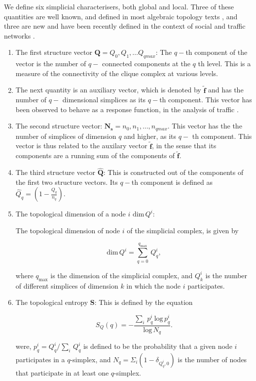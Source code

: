 \documentclass[aps,pre,superscriptaddress,groupedaddress,preprint]{revtex4}  %
\begin{document}
We define six simplicial characterisers, both global and local. Three of these quantities are well known, and defined in most algebraic topology texts \cite{jonsson}, and three  are new and have been recently defined in the context of social and traffic networks \cite{Maletic, Andjelkovich}. 

\begin{enumerate}

\item The first structure vector $\mathbf{Q} = Q_{0},Q_{1}, \ldots Q_{qmax}$: 
The $q-$th component of the vector is the number of $q-$ connected components at the $q$ th level.
This is a measure of the connectivity of the clique complex at various levels.   
\item The next quantity is an auxiliary vector, which is denoted by $\mathbf{\tilde{f}}$ and has the number of $q-$ dimensional simplices as its $q-$th component. This vector has been observed to behave as a response function, in the analysis of traffic \cite{Andjelkovich}.

\item The second structure vector: $\mathbf{N_s}=n_0, n_1, \ldots, n_{qmax}$. This vector has the the number of simplices of dimension $q$ and higher, as its $q-$ th component. This vector is thus related to the auxilary vector $\mathbf{\tilde{f}}$, in the sense that its components are a running sum of the components of $\mathbf{\tilde{f}}$.

\item The third structure vector $\mathbf{\widehat{Q}}$: This is constructed out of the components of the first two structure vectors. Its $q-$th component is defined as 
$\widehat{Q}_q= \left(1-\frac{Q_q}{n_q}\right)$.

\item   

The topological dimension of a node $i$  $\mathrm{dim}\, Q^{i}$: 

The topological dimension of node $i$ of the simplicial complex, is given by

\begin{equation}
\mathrm{dim}\,Q^i = \sum_{q=0}^{q_{\mathrm{max}}}\,Q_q^i,
\end{equation}

where $q_{\mathrm{max}}$ is the dimension of the simplicial complex, and $Q_{k}^{i}$ is the number of different simplices of dimension $k$ in which the node $i$ participates.  


\item The topological entropy $\mathbf{S}$: This is defined by the equation 

\begin{equation}
S_Q(q) = - \frac{\sum_i\, p_q^i\,\mathrm{log}\,p_q^i}{\mathrm{log}\,N_q}.
\end{equation}

were, $p_q^i = {Q_q^i}/{\sum_i\, Q_q^i} $ is defined to be the probability that a given  node $i$ participates  in a $q$-simplex, and $N_q = \Sigma_i \left(1 - \delta_{Q_q^i,0}\right)$ is the number of nodes that participate in at least one $q$-simplex.

\end{enumerate}
\end{document}
